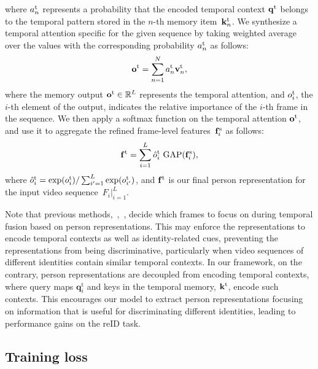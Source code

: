 \documentclass[10pt,twocolumn,letterpaper]{article}
\begin{document}
			where $a^{\text t}_{n}$ represents a probability that the encoded temporal context $\mathbf{q}^{\text t}$ belongs to the temporal pattern stored in the $n$-th memory item~$\mathbf{k}^{\text t}_n$. We synthesize a temporal attention specific for the given sequence by taking weighted average over the values with the corresponding probability $a^{\text t}_{n}$ as follows:
					\begin{equation}
						\mathbf{o}^{\text t} = \sum_{n=1}^{N} a^{\text t}_{n} \mathbf{v}^{\text t}_n,
					\label{eq:att}
					\end{equation}
			where the memory output $\mathbf{o}^{\text t} \in \mathbb{R}^{L}$ represents the temporal attention, and $o^{\text t}_{i}$, the $i$-th element of the output, indicates the relative importance of the $i$-th frame in the sequence. We then apply a softmax function on the temporal attention $\mathbf{o}^{\text t}$, and use it to aggregate the refined frame-level features~$\mathbf{f}^{\text s}_i$ as follows:
					\begin{equation}
						\mathbf{f}^{\text t} = \sum_{i=1}^{L} \hat{o}^{\text t}_{i} \ \text{GAP}(\mathbf{f}^{\text s}_i),
					\end{equation}
			where $\hat{o}^{\text t}_{i} = \exp(o^{\text t}_{i})/\sum_{i^\prime=1}^{L}\exp(o^{\text t}_{i^\prime})$, and $\mathbf{f}^{\text t}$ is our final person representation for the input video sequence~$F_i|_{i=1}^L$.
			
			Note that previous methods,~\eg,~\cite{zhou2017see,li2018diversity,fu2019sta,li2019multi,li2019global,liu2019spatially,subramaniam2019co,yan2020learning}, decide which frames to focus on during temporal fusion based on person representations. This may enforce the representations to encode temporal contexts as well as identity-related cues, preventing the representations from being discriminative, particularly when video sequences of different identities contain similar temporal contexts. In our framework, on the contrary, person representations are decoupled from encoding temporal contexts, where query maps $\mathbf{q}^\text{t}_i$ and keys in the temporal memory, $\mathbf{k}^{\text t}$, encode such contexts. This encourages our model to extract person representations focusing on information that is useful for discriminating different identities, leading to performance gains on the reID task.


	\vspace{-0.1cm}
	\subsection{Training loss} \label{subsec:training_loss}
	\vspace{-0.1cm}
	
\end{document}

